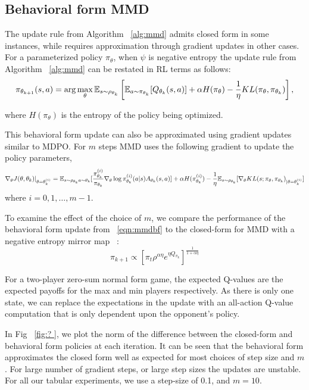\subsection{Behavioral form MMD}

The update rule from Algorithm~ \ref{alg:mmd} admits closed form in some instances, while requires
approximation through gradient updates in other cases.
For a parameterized policy $\pi_\theta$, when $\psi$ is negative entropy the update rule from
Algorithm~ \ref{alg:mmd} can be restated in RL terms as follows:
\begin{equation}
	\label{eqn:mmdbf}
	\pi_{ \theta_{k+1}}(s,a) = \arg \max_{\theta} \mathbb{E}_{s \sim \rho_{\theta_k}} \left[ \mathbb{E}_{a \sim
			\pi_{\theta_k}} [Q_{\theta_k}(s, a)] + \alpha H(\pi_\theta) - \frac{1}{\eta} KL(\pi_\theta,
		\pi_{\theta_k}) \right],
\end{equation}

where $H(\pi_\theta)$ is the entropy of
the policy being optimized.

This behavioral form update can also be approximated using gradient updates similar to MDPO.
For $m$ steps MMD uses the following gradient to update the policy parameters,
\begin{equation}
	\label{eqn:mmdgrad} \nabla_{\theta} J(\theta, \theta_k)|_{\theta = \theta_k^{(i)}} = \mathbb{E}_{s \sim
		\rho_{\theta_k} \\ a \sim \theta_k} [ \frac{ \pi_{\theta_k}^{(i)}}{ \pi_{\theta_k}} \nabla_{\theta}
		\log \pi_{\theta_k}^{(i)} (a|s) A_{\theta_k}(s,a)] + \alpha H( \pi_{\theta_k}^{(i)}) -
	\frac{1}{\eta} \mathbb{E}_{s \sim \rho_{\theta_k}} [\nabla_\theta KL(s; \pi_\theta,
		\pi_{\theta_k})_{|\theta= \theta_k^{(i)}}]
\end{equation} where $i=0,1,\ldots,m-1$.

To examine the effect of the choice of $m$, we compare the performance of the behavioral form
update from~ \ref{eqn:mmdbf} to the closed-form for MMD with a negative entropy mirror map~
\cite[equation (12)]{sokotaUnified2023}: $$ \pi_{k+1} \propto [\pi_t \rho^{\alpha \eta} e^{\eta
				Q_{\pi_k}}]^{ \frac{1}{1+\alpha \eta}}$$

For a two-player zero-sum normal form
game, the expected Q-values are the expected payoffs for the max and min players respectively.
As there is only one state, we can replace the expectations in the update with an all-action
Q-value computation that is only dependent upon the opponent's policy.

In Fig~ \ref{fig:?
}, we plot the norm of the difference between the closed-form and behavioral form policies at each iteration.
It can be seen that the behavioral form approximates the closed form well as expected for most
choices of step size and $m$.
For large number of gradient steps, or large step sizes the updates are unstable.
For all our tabular experiments, we use a step-size of 0.1, and $m=10$.

